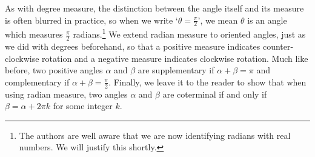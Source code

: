 \documentclass[10pt]{article}
\begin{document}
As with degree measure, the distinction between the angle itself and its measure is often blurred in practice, so when we write  `$\theta = \frac{\pi}{2}$', we mean $\theta$ is an angle which measures $\frac{\pi}{2}$ radians.\footnote{The authors are well aware that we are now identifying radians with real numbers.  We will justify this shortly.} We extend radian measure to oriented angles, just as we did with degrees beforehand, so that a positive measure indicates counter-clockwise rotation and a negative measure indicates clockwise rotation. Much like before, two positive angles $\alpha$ and $\beta$ are supplementary if $\alpha + \beta = \pi$ and complementary if $\alpha + \beta = \frac{\pi}{2}$.   Finally, we leave it to the reader to show that when using radian measure, two angles $\alpha$ and $\beta$ are coterminal if and only if $\beta = \alpha + 2\pi k$ for some integer $k$. 
\end{document}
